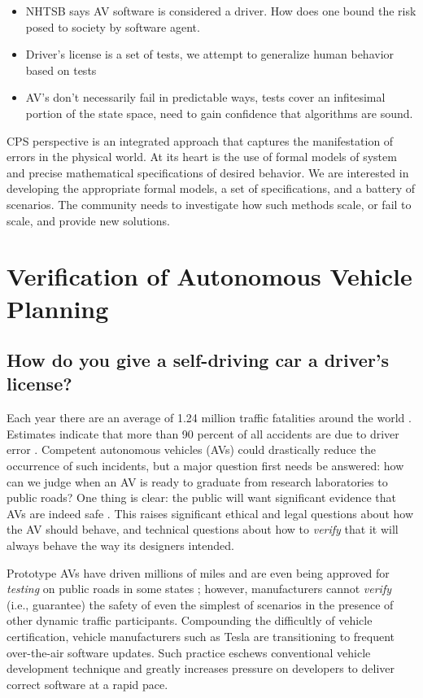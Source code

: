 \begin{itemize}
	\item NHTSB says AV software is considered a driver. How does one bound the risk posed to society by software agent. 
	\item Driver's license is a set of tests, we attempt to generalize human behavior based on tests
	\item AV's don't necessarily fail in predictable ways, tests cover an infitesimal portion of the state space, need to gain confidence that algorithms are sound.
\end{itemize}
CPS perspective is an integrated approach that captures the manifestation of errors in the physical world. At its heart is the use of formal models of system and precise mathematical specifications of desired behavior. We are interested in developing the appropriate formal models, a set of specifications, and a battery of scenarios. The community needs to investigate how such methods scale, or fail to scale, and provide new solutions.

 \section{Verification of Autonomous Vehicle Planning}
 
 \subsection{How do you give a self-driving car a driver's license?}
 Each year there are an average of 1.24 million traffic fatalities around the world \cite{Waldrop2015}. Estimates indicate that more than 90 percent of all accidents are due to driver error \cite{Waldrop2015}. Competent autonomous vehicles (AVs) could drastically reduce the occurrence of such incidents, but a major question first needs be answered:
 how can we judge when an AV is ready to graduate from research laboratories to public roads?
 One thing is clear: the public will want significant evidence that AVs are indeed safe \cite{weld1994first}. 
 This raises significant ethical and legal questions about how the AV should behave, and technical questions about how to \emph{verify} that it will always behave the way its designers intended.
 
 Prototype AVs have driven millions of miles and are even being approved for \emph{testing} on public roads in some states \cite{Iozzio2014}; however, manufacturers cannot \emph{verify} (i.e., guarantee) the safety of even the simplest of scenarios in the presence of other dynamic traffic participants. 
 Compounding the difficultly of vehicle certification, vehicle manufacturers such as Tesla are transitioning to frequent over-the-air software updates. Such practice eschews conventional vehicle development technique and greatly increases pressure on developers to deliver correct software at a rapid pace. 
 
